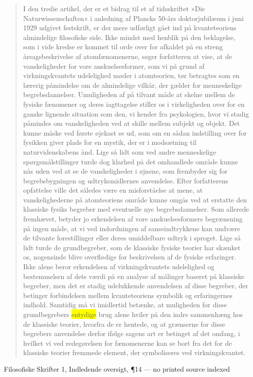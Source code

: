 \documentclass[11pt]{article}
\newcommand{\dcite}[1]{{\nopagebreak\raggedleft\small #1\par}\medskip}
\newcommand{\tlg}[1]{{\setlength{\fboxsep}{0.8pt}\colorbox{yellow}{#1}}}
\begin{document}
\begin{quote}
I den tredie artikel, der er et bidrag til et af tidsskriftet »Die Naturwissenschaften« i anledning af Plancks 50-års doktorjubilæum i juni 1929 udgivet festskrift, er der mere udførligt gået ind på kvanteteoriens almindelige filosofiske side. Ikke mindst med henblik på den beklagelse, som i vide kredse er kommet til orde over for afkaldet på en streng årsagsbeskrivelse af atomfænomenerne, søger forfatteren at vise, at de vanskeligheder for vore anskuelsesformer, som vi på grund af virkningskvantets udelelighed møder i atomteorien, tør betragtes som en lærerig påmindelse om de almindelige vilkår, der gælder for menneskelige begrebsdannelser. Umuligheden af på tilvant måde at skelne mellem de fysiske fænomener og deres iagttagelse stiller os i virkeligheden over for en ganske lignende situation som den, vi kender fra psykologien, hvor vi stadig påmindes om vanskeligheden ved at skille mellem subjekt og objekt. Det kunne måske ved første øjekast se ud, som om en sådan indstilling over for fysikken giver plads for en mystik, der er i modsætning til naturvidenskabens ånd. Lige så lidt som ved andre menneskelige spørgsmålstillinger turde dog klarhed på det omhandlede område kunne nås uden ved at se de vanskeligheder i øjnene, som frembyder sig for begrebsbygningen og udtryksmidlernes anvendelse. Efter forfatterens opfattelse ville det således være en misforståelse at mene, at vanskelighederne på atomteoriens område kunne omgås ved at erstatte den klassiske fysiks begreber med eventuelle nye begrebsdannelser. Som allerede fremhævet, betyder jo erkendelsen af vore anskuelsesformers begrænsning på ingen måde, at vi ved indordningen af sanseindtrykkene kan undvære de tilvante forestillinger eller deres umiddelbare udtryk i sproget. Lige så lidt turde de grundbegreber, som de klassiske fysiske teorier har skænket os, nogensinde blive overflødige for beskrivelsen af de fysiske erfaringer. Ikke alene beror erkendelsen af virkningskvantets udelelighed og bestemmelsen af dets værdi på en analyse af målinger baseret på klassiske begreber, men det er stadig udelukkende anvendelsen af disse begreber, der betinger forbindelsen mellem kvanteteoriens symbolik og erfaringernes indhold. Samtidig må vi imidlertid betænke, at muligheden for disse grundbegrebers \tlg{entydige} brug alene hviler på den indre sammenhæng hos de klassiske teorier, hvorfra de er hentede, og at grænserne for disse begrebers anvendelse derfor ifølge sagens art er betinget af det omfang, i hvilket vi ved redegørelsen for fænomenerne kan se bort fra det for de klassiske teorier fremmede element, der symboliseres ved virkningskvantet.
\end{quote}
\dcite{Filosofiske Skrifter 1, Indledende oversigt, ¶14 — no printed source indexed}
\end{document}
